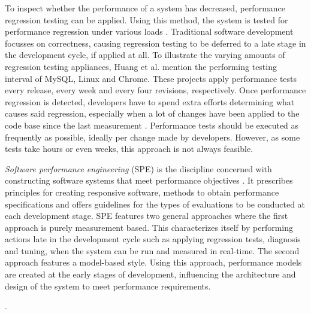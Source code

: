 To inspect whether the performance of a system has decreased, performance regression testing can be applied.
Using this method, the system is tested for performance regression under various loads \cite{woodside2007future}.
Traditional software development focusses on correctness, causing regression testing to be deferred to a late stage in the development cycle, if applied at all.
To illustrate the varying amounts of regression testing appliances, Huang et al. mention the performing testing interval of MySQL, Linux and Chrome.
These projects apply performance tests every release, every week and every four revisions, respectively.
Once performance regression is detected, developers have to spend extra efforts determining what causes said regression, especially when a lot of changes have been applied to the code base since the last measurement \cite{huang2014performance}.
Performance tests should be executed as frequently as possible, ideally per change made by developers.
However, as some tests take hours or even weeks, this approach is not always feasible.

\emph{Software performance engineering} (SPE) is the discipline concerned with constructing software systems that meet performance objectives \cite{smith2003best}.
It prescribes principles for creating responsive software, methods to obtain performance specifications and offers guidelines for the types of evaluations to be conducted at each development stage.
SPE features two general approaches \cite{woodside2007future} where the first approach is purely measurement based.
This characterizes itself by performing actions late in the development cycle such as  applying regression tests, diagnosis and tuning, when the system can be run and measured in real-time.
The second approach features a model-based style.
Using this approach, performance models are created at the early stages of development, influencing the architecture and design of the system to meet performance requirements.

.

